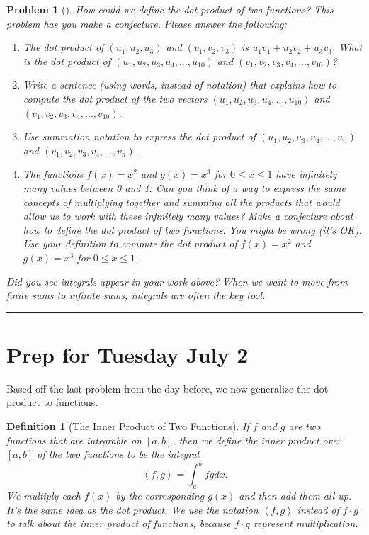 \documentclass[letterpaper,oneside]{book}%
\theoremstyle{plain}
\theoremstyle{box}
\newtheorem{definition}[theorem]{Definition}
\theoremstyle{problem}
\newtheorem{problemnum}{Problem}[chapter]
\newtheorem*{hwenum*}{Home Work Practice}
\newenvironment{problem}[1][]{\begin{problemnum}[#1]}{\end{problemnum}\nopagebreak\hrule\bigskip}
\newenvironment{hw*}[1][]{\begin{hwenum*}[#1]}{\end{hwenum*}\nopagebreak\hrule\bigskip}
\begin{document}
\begin{problem}
How could we define the dot product of two functions? This problem has you make a conjecture. Please answer the following:  
\begin{enumerate}
 \item The dot product of $(u_1,u_2,u_3)$ and $(v_1,v_2,v_3)$ is $u_1v_1+u_2v_2+u_3v_3$.  What is the dot product of $(u_1,u_2,u_3, u_4, \ldots, u_{10})$ and $(v_1,v_2,v_3, v_4,\ldots, v_{10})$?
 \item Write a sentence (using words, instead of notation) that explains how to compute the dot product of the two vectors $(u_1,u_2,u_3, u_4, \ldots, u_{10})$ and $(v_1,v_2,v_3, v_4,\ldots, v_{10})$.
 \item Use summation notation to express the dot product of $(u_1,u_2,u_3, u_4, \ldots, u_n)$ and $(v_1,v_2,v_3, v_4,\ldots, v_n)$.  
 \item The functions $f(x) = x^2$ and $g(x)=x^3$ for $0\leq x\leq 1$ have infinitely many values between 0 and 1. Can you think of a way to express the same concepts of multiplying together and summing all the products that would allow us to work with these infinitely many values? Make a conjecture about how to define the dot product of two functions. You might be wrong (it's OK). Use your definition to compute the dot product of $f(x)=x^2$ and $g(x)=x^3$ for $0\leq x \leq 1$.
\end{enumerate}
Did you see integrals appear in your work above?  When we want to move from finite sums to infinite sums, integrals are often the key tool.
\end{problem}










\section{Prep for Tuesday July 2}

\begin{hw*}
 
\end{hw*}

Based off the last problem from the day before, we now generalize the dot product to functions.
\begin{definition}[The Inner Product of Two Functions]
 If $f$ and $g$ are two functions that are integrable on $[a,b]$, then we define the inner product over $[a,b]$  of the two functions to be the integral 
 $$\left<f,g\right> = \int_a^b f g dx.$$ 
 We multiply each $f(x)$ by the corresponding $g(x)$ and then add them all up.  It's the same idea as the dot product. 
 We use the notation $\left<f,g\right>$ instead of $f\cdot g$ to talk about the inner product of functions, because $f\cdot g$ represent multiplication.
\end{definition}
\end{document}

